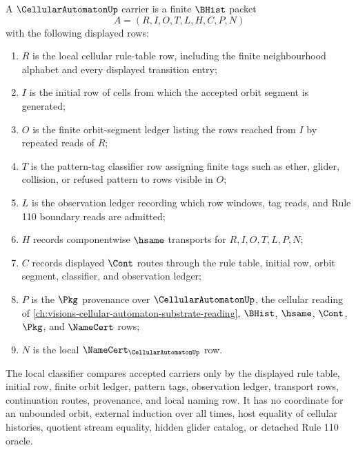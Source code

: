 \begin{definition}
\label{def:cellular-automaton-namecert-carrier}
A $\CellularAutomatonUp$ carrier is a finite $\BHist$ packet
$$
A=(R,I,O,T,L,H,C,P,N)
$$
with the following displayed rows:
\begin{enumerate}
\item $R$ is the local cellular rule-table row, including the finite neighbourhood alphabet and every displayed transition entry;
\item $I$ is the initial row of cells from which the accepted orbit segment is generated;
\item $O$ is the finite orbit-segment ledger listing the rows reached from $I$ by repeated reads of $R$;
\item $T$ is the pattern-tag classifier row assigning finite tags such as ether, glider, collision, or refused pattern to rows visible in $O$;
\item $L$ is the observation ledger recording which row windows, tag reads, and Rule 110 boundary reads are admitted;
\item $H$ records componentwise $\hsame$ transports for $R,I,O,T,L,P,N$;
\item $C$ records displayed $\Cont$ routes through the rule table, initial row, orbit segment, classifier, and observation ledger;
\item $P$ is the $\Pkg$ provenance over $\CellularAutomatonUp$, the cellular reading of \autoref{ch:visions-cellular-automaton-substrate-reading}, $\BHist$, $\hsame$, $\Cont$, $\Pkg$, and $\NameCert$ rows;
\item $N$ is the local $\NameCert_{\CellularAutomatonUp}$ row.
\end{enumerate}
The local classifier compares accepted carriers only by the displayed rule table, initial row, finite orbit ledger, pattern tags, observation ledger, transport rows, continuation routes, provenance, and local naming row. It has no coordinate for an unbounded orbit, external induction over all times, host equality of cellular histories, quotient stream equality, hidden glider catalog, or detached Rule 110 oracle.
\end{definition}

